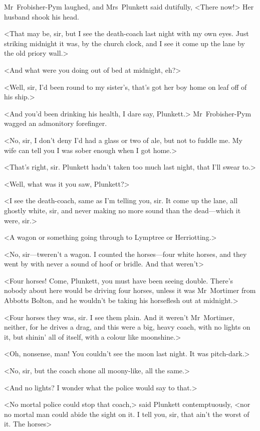 Mr~Frobisher-Pym laughed, and Mrs~Plunkett said dutifully, <There now!> Her husband shook his head.

<That may be, sir, but I see the death-coach last night with my own eyes. Just striking midnight it was, by the church clock, and I see it come up the lane by the old priory wall.>

<And what were you doing out of bed at midnight, eh?>

<Well, sir, I'd been round to my sister's, that's got her boy home on leaf off of his ship.>

<And you'd been drinking his health, I dare say, Plunkett.> Mr~Frobisher-Pym wagged an admonitory forefinger.

<No, sir, I don't deny I'd had a glass or two of ale, but not to fuddle me. My wife can tell you I was sober enough when I got home.>

<That's right, sir. Plunkett hadn't taken too much last night, that I'll swear to.>

<Well, what was it you saw, Plunkett?>

<I see the death-coach, same as I'm telling you, sir. It come up the lane, all ghostly white, sir, and never making no more sound than the dead—which it were, sir.>

<A wagon or something going through to Lymptree or Herriotting.>

<No, sir—tweren't a wagon. I counted the horses—four white horses, and they went by with never a sound of hoof or bridle. And that weren't\longdash>

<Four horses! Come, Plunkett, you must have been seeing double. There's nobody about here would be driving four horses, unless it was Mr~Mortimer from Abbotts Bolton, and he wouldn't be taking his horseflesh out at midnight.>

<Four horses they was, sir. I see them plain. And it weren't Mr~Mortimer, neither, for he drives a drag, and this were a big, heavy coach, with no lights on it, but shinin' all of itself, with a colour like moonshine.>

<Oh, nonsense, man! You couldn't see the moon last night. It was pitch-dark.>

<No, sir, but the coach shone all moony-like, all the same.>

<And no lights? I wonder what the police would say to that.>

<No mortal police could stop that coach,> said Plunkett contemptuously, <nor no mortal man could abide the sight on it. I tell you, sir, that ain't the worst of it. The horses\longdash>

